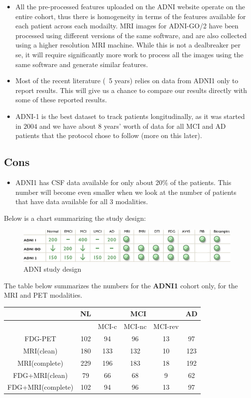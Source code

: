 \documentclass[12pt,a4paper]{article}
\begin{document}
\begin{itemize}
\item All the pre-processed features uploaded on the ADNI website
  operate on the entire cohort, thus there is homogeneity in terms of
  the features available for each patient across each modailty. MRI
  images for ADNI-GO/2 have been processed using different versions of
  the same software, and are also collected using a higher resolution
  MRI machine. While this is not a dealbreaker per se, it will require
  significantly more work to process all the images using the same
  software and generate similar features.
\item Most of the recent literature (~5 years) relies on data from ADNI1
  only to report results. This will give us a chance to compare our
  results directly with some of these reported results.
\item ADNI-1 is the best dataset to track patients longitudinally, as
  it was started in $2004$ and we have about $8$ years' worth of data
  for all MCI and AD patients that the protocol chose to follow (more
  on this later). 
\end{itemize}

\subsection{Cons}

\begin{itemize}
\item ADNI1 has CSF data available for only about 20\% of the
  patients. This number will become even smaller when we look at the
  number of patients that have data available for all 3 modalities.
\end{itemize}

Below is a chart summarizing the study design:

\begin{figure}[ht]
  \centering
  \includegraphics[width=\textwidth]{study-design.png}
  \caption{\label{fig:design}ADNI study design}
\end{figure}

The table below summarizes the numbers for the \textbf{ADNI1} cohort
only, for the MRI and PET modalities.

\begin{tabular}[H]{c | c | c | c | c | c}
  & NL & \multicolumn{3}{|c|}{MCI} & AD\\
\hline
& & MCI-c & MCI-nc & MCI-rev &\\
\hline
FDG-PET & 102 & 94 & 96 & 13 & 97\\
MRI(clean) & 180 & 133 & 132 & 10 & 123\\
MRI(complete) & 229 & 196 & 183 & 18 & 192\\
FDG+MRI(clean) & 79 & 66 & 68 & 9 & 62\\
FDG+MRI(complete) & 102 & 94 & 96 & 13 & 97\\
\end{tabular}
\end{document}

